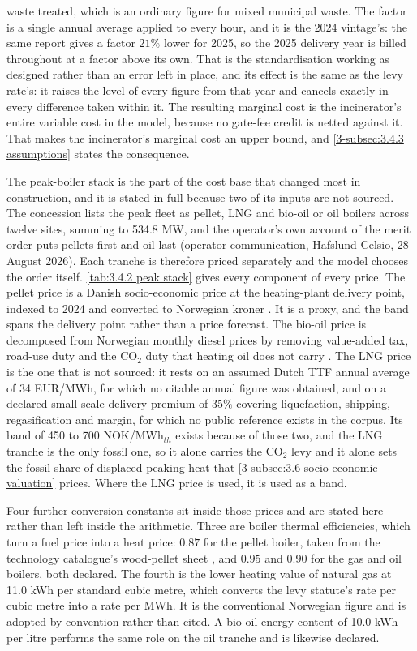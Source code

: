 waste treated, which is an ordinary figure for mixed municipal waste. The factor is a single annual average applied to every hour, and it is the 2024 vintage's: the same report gives a factor $21\%$ lower for 2025, so the 2025 delivery year is billed throughout at a factor above its own. That is the standardisation working as designed rather than an error left in place, and its effect is the same as the levy rate's: it raises the level of every figure from that year and cancels exactly in every difference taken within it. The resulting marginal cost is the incinerator's entire variable cost in the model, because no gate-fee credit is netted against it. That makes the incinerator's marginal cost an upper bound, and \autoref{3-subsec:3.4.3 assumptions} states the consequence.

The peak-boiler stack is the part of the cost base that changed most in construction, and it is stated in full because two of its inputs are not sourced. The concession lists the peak fleet as pellet, LNG and bio-oil or oil boilers across twelve sites, summing to 534.8 MW, and the operator's own account of the merit order puts pellets first and oil last (operator communication, Hafslund Celsio, 28 August 2026). Each tranche is therefore priced separately and the model chooses the order itself. \autoref{tab:3.4.2 peak stack} gives every component of every price. The pellet price is a Danish socio-economic price at the heating-plant delivery point, indexed to 2024 and converted to Norwegian kroner \cite{energistyrelsen_dk_samfundsokonomiske_2024}. It is a proxy, and the band spans the delivery point rather than a price forecast. The bio-oil price is decomposed from Norwegian monthly diesel prices by removing value-added tax, road-use duty and the CO$_2$ duty that heating oil does not carry \cite{statistisk_sentralbyra_statbank_nodate}. The LNG price is the one that is not sourced: it rests on an assumed Dutch TTF annual average of 34 EUR/MWh, for which no citable annual figure was obtained, and on a declared small-scale delivery premium of $35\%$ covering liquefaction, shipping, regasification and margin, for which no public reference exists in the corpus. Its band of 450 to 700 NOK/MWh$_{th}$ exists because of those two, and the LNG tranche is the only fossil one, so it alone carries the CO$_2$ levy and it alone sets the fossil share of displaced peaking heat that \autoref{3-subsec:3.6 socio-economic valuation} prices. Where the LNG price is used, it is used as a band.

Four further conversion constants sit inside those prices and are stated here rather than left inside the arithmetic. Three are boiler thermal efficiencies, which turn a fuel price into a heat price: $0.87$ for the pellet boiler, taken from the technology catalogue's wood-pellet sheet \cite{danish_energy_agency_energy_2025}, and $0.95$ and $0.90$ for the gas and oil boilers, both declared. The fourth is the lower heating value of natural gas at 11.0 kWh per standard cubic metre, which converts the levy statute's rate per cubic metre into a rate per MWh. It is the conventional Norwegian figure and is adopted by convention rather than cited. A bio-oil energy content of 10.0 kWh per litre performs the same role on the oil tranche and is likewise declared.

